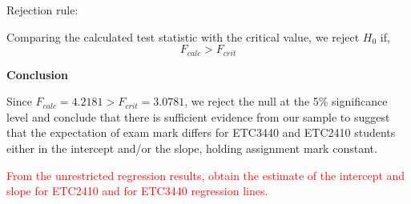 \documentclass[12pt]{report}
\begin{document}
\noindent Rejection rule: 

\noindent Comparing the calculated test statistic with the critical value, we reject $H_0$ if,
$$F_{calc} > F_{crit}$$

\noindent \textbf{Conclusion}

\noindent Since $F_{calc}=4.2181 > F_{crit}=3.0781$, we reject the null at the 5\% significance level and conclude that there is sufficient evidence from our sample to suggest that the expectation of exam mark differs for ETC3440 and ETC2410 students either in the intercept and/or the slope, holding assignment mark constant.

\newpage
\noindent \textcolor{red}
{
	From the unrestricted regression results, obtain the estimate of the intercept and slope for ETC2410 and for ETC3440 regression lines.
}
\end{document}

